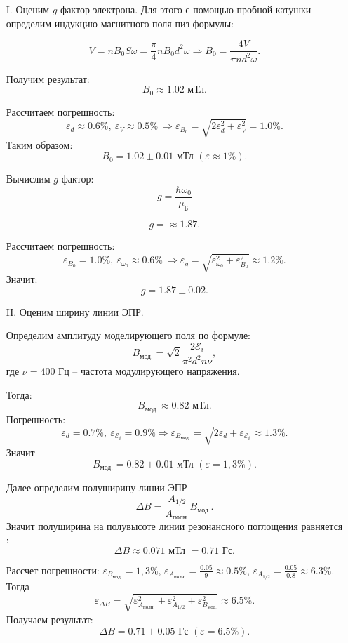 \documentclass[a4paper,12pt]{article}
\begin{document}
	\begin{enumerate}
		\item[I.] Оценим $g$ фактор электрона. Для этого с помощью пробной катушки определим индукцию магнитного поля пиз формулы:
		
		\begin{equation}
		V = nB_{0}S\omega = \frac{\pi}{4}nB_{0}d^{2}\omega \Longrightarrow B_{0} = \frac{4V}{\pi nd^{2}\omega}.
		\end{equation}
		
		Получим результат:
		\[B_{0} \approx 1.02\text{ мТл}.\]
		
		Рассчитаем погрешность:
		$$\varepsilon_{d} \approx 0.6\%,\ \varepsilon_{V}\approx 0.5\%\ \Rightarrow \varepsilon_{B_{0}} = \sqrt{2\varepsilon_{d}^{2} + \varepsilon_{V}^{2}} = 1.0\%.$$
		Таким образом: 
		\[B_{0} = 1.02\pm 0.01 \text{ мТл } (\varepsilon\approx 1\%).\]
		
		Вычислим $g$-фактор:
		\[g = \frac{\hbar\omega_{0}}{\mu_{\text{Б}}} \]
		
		\[g =\approx 1.87.\]
		
		Рассчитаем погрешность: $$\varepsilon_{B_{0}} = 1.0\%,\ \varepsilon_{\omega_{0}}\approx 0.6\%\ \Rightarrow \varepsilon_{g} = \sqrt{\varepsilon_{\omega_{0}}^{2}+\varepsilon_{B_{0}}^{2}}\approx 1.2\%.$$
		Значит:
		\[g = 1.87\pm 0.02.\]
		
		\item[II.] Оценим ширину линии ЭПР.
		
		Определим амплитуду моделирующего поля по формуле:
		\begin{equation}
		B_{\text{мод.}} = \sqrt{2}\frac{2\mathcal{E}_{i}}{\pi^{2}d^{2}n\nu},
		\end{equation}
		где $\nu = 400$ Гц -- частота модулирующего напряжения.
		
		Тогда:
		\[B_{\text{мод.}} \approx 0.82\text{ мТл.}\]
		Погрешность: 
		$$\varepsilon_{d} = 0.7\%,\  \varepsilon_{\mathcal{E}_{i}} = 0.9\% \Rightarrow \varepsilon_{B_{\text{мод.}}} = \sqrt{2\varepsilon_{d} + \varepsilon_{\mathcal{E}_{i}}}\approx 1.3\%.$$ 
		Значит
		\[B_{\text{мод.}} = 0.82\pm 0.01\text{ мТл } (\varepsilon = 1,3\%).\]
		
		Далее определим полуширину линии ЭПР
		\begin{equation}
		\Delta B = \frac{A_{1/2}}{A_\text{полн.}}B_{\text{мод.}}.
		\end{equation}
		Значит полуширина на полувысоте линии резонансного поглощения равняется :
		\[\Delta B \approx 0.071\text{ мТл } = 0.71\text{ Гс}.\]
		
	Рассчет погрешности: $\varepsilon_{B_{\text{мод.}}} = 1,3\%$, $\varepsilon_{A_{\text{полн.}}} = \frac{0.05}{9}\approx 0.5\%$, $\varepsilon_{A_{1/2}} = \frac{0.05}{0.8}\approx 6.3\%$. Тогда 
	$$\varepsilon_{\Delta B} = \sqrt{\varepsilon_{A_{\text{полн.}}}^{2}+\varepsilon_{A_{1/2}}^{2}+\varepsilon_{B_{\text{мод.}}}^{2}}\approx 6.5\%.$$
	Получаем результат:
	\[\Delta B = 0.71\pm 0.05\text{ Гс } (\varepsilon = 6.5\%).\]
	\end{enumerate}
\end{document}
